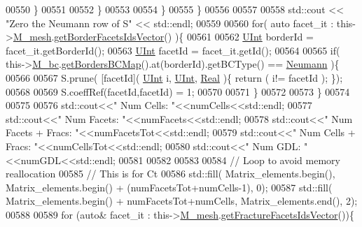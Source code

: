 \begin{DoxyCode}
00550                 \}
00551                 
00552             \}
00553 
00554         \}
00555     \}
00556     
00557 
00558     std::cout << \textcolor{stringliteral}{"Zero the Neumann row of S"} << std::endl;
00559     
00560         \textcolor{keywordflow}{for}( \textcolor{keyword}{auto} facet\_it : this->\hyperlink{classFVCode3D_1_1MatrixHandler_a72f185cb557fc2e8023bd09a074f685c}{M\_mesh}.\hyperlink{classFVCode3D_1_1Rigid__Mesh_aa72b7fad937f0d1586fc10b176ef5d3e}{getBorderFacetsIdsVector}() )\{
00561                 
00562                 \hyperlink{namespaceFVCode3D_a4bf7e328c75d0fd504050d040ebe9eda}{UInt} borderId = facet\_it.getBorderId();
00563                 \hyperlink{namespaceFVCode3D_a4bf7e328c75d0fd504050d040ebe9eda}{UInt} facetId  = facet\_it.getId();
00564                 
00565                 \textcolor{keywordflow}{if}( this->\hyperlink{classFVCode3D_1_1StiffMatrix_a23e3ffc97fcf112958e9966cac41e9d3}{M\_bc}.\hyperlink{classFVCode3D_1_1BoundaryConditions_a5b53a81bdab88709fae14892bfe6a7c9}{getBordersBCMap}().at(borderId).getBCType() == 
      \hyperlink{namespaceFVCode3D_a73660061f11f1671164ce171a053f8c5a30212425b27314b01b40f4984dbf850a}{Neumann} )\{
00566                         
00567                         S.prune( [facetId]( \hyperlink{namespaceFVCode3D_a4bf7e328c75d0fd504050d040ebe9eda}{UInt} i, \hyperlink{namespaceFVCode3D_a4bf7e328c75d0fd504050d040ebe9eda}{UInt}, \hyperlink{namespaceFVCode3D_a40c1f5588a248569d80aa5f867080e83}{Real} )\{ \textcolor{keywordflow}{return} ( i!= facetId ); \});
00568                         
00569                         S.coeffRef(facetId,facetId) = 1;
00570                         
00571                         \}
00572                 
00573                 \}  
00574 
00575 
00576     std::cout<<\textcolor{stringliteral}{" Num Cells: "}<<numCells<<std::endl;
00577     std::cout<<\textcolor{stringliteral}{" Num Facets: "}<<numFacets<<std::endl;
00578     std::cout<<\textcolor{stringliteral}{" Num Facets + Fracs: "}<<numFacetsTot<<std::endl;
00579     std::cout<<\textcolor{stringliteral}{" Num Cells + Fracs: "}<<numCellsTot<<std::endl;
00580     std::cout<<\textcolor{stringliteral}{" Num GDL: "}<<numGDL<<std::endl;
00581 
00582 
00583 
00584         \textcolor{comment}{// Loop to avoid memory reallocation}
00585         \textcolor{comment}{// This is for Ct}
00586         std::fill( Matrix\_elements.begin(), Matrix\_elements.begin() + (numFacetsTot+numCells-1), 0);    
00587     std::fill( Matrix\_elements.begin() + numFacetsTot+numCells, Matrix\_elements.end(), 2);
00588     
00589     \textcolor{keywordflow}{for} (\textcolor{keyword}{auto}& facet\_it : this->\hyperlink{classFVCode3D_1_1MatrixHandler_a72f185cb557fc2e8023bd09a074f685c}{M\_mesh}.\hyperlink{classFVCode3D_1_1Rigid__Mesh_aadbe6d9ad704122537903396d91238e0}{getFractureFacetsIdsVector}())\{

\end{DoxyCode}
